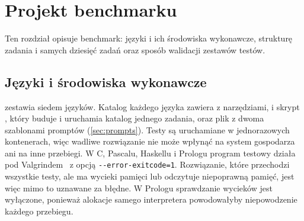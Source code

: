 \chapter{Projekt benchmarku}
\label{ch:benchmark}

Ten rozdział opisuje benchmark: języki i ich środowiska wykonawcze, strukturę zadania i samych
dziesięć zadań oraz sposób walidacji zestawów testów.

\section{Języki i środowiska wykonawcze}
\label{sec:languages}

 zestawia siedem języków. Katalog każdego języka zawiera 
z narzędziami,  i skrypt , który buduje i uruchamia katalog jednego
zadania, oraz plik  z dwoma szablonami promptów (\cref{sec:prompts}). Testy są
uruchamiane w jednorazowych kontenerach, więc wadliwe rozwiązanie nie może wpłynąć na system
gospodarza ani na inne przebiegi. W C, Pascalu, Haskellu i Prologu program testowy działa pod
Valgrindem~\cite{nethercote2007valgrind} z opcją \texttt{-{}-error-exitcode=1}. Rozwiązanie, które
przechodzi wszystkie testy, ale ma wycieki pamięci lub odczytuje niepoprawną pamięć, jest więc mimo
to uznawane za błędne. W Prologu sprawdzanie wycieków jest wyłączone, ponieważ alokacje samego
interpretera powodowałyby niepowodzenie każdego przebiegu.

